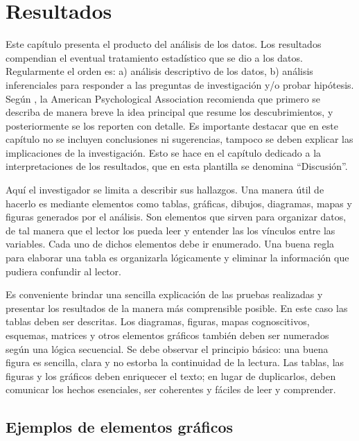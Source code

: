 \fancyhead{}
\fancyfoot{}
\cfoot{\thepage}


\chapter{Resultados}

Este capítulo presenta el producto del análisis de los datos. Los resultados compendian el eventual tratamiento estadístico que se dio a los datos. Regularmente el orden es: a) análisis descriptivo de los datos, b) análisis inferenciales para responder a las preguntas de investigación y/o probar hipótesis. Según \cite{sampieri}, la American Psychological Association recomienda que primero se describa de manera breve la idea principal que resume los descubrimientos, y posteriormente se los reporten con detalle. Es importante destacar que en este capítulo no se incluyen conclusiones ni sugerencias, tampoco se deben explicar las implicaciones de la investigación. Esto se hace en el capítulo dedicado a la interpretaciones de los resultados, que en esta plantilla se denomina ``Discusión''.

Aquí el investigador se limita a describir sus hallazgos. Una manera útil de hacerlo es mediante elementos como tablas, gráficas, dibujos, diagramas, mapas y figuras generados por el análisis. Son elementos que sirven para organizar datos, de tal manera que el lector los pueda leer y entender las los vínculos entre las variables. Cada uno de dichos elementos debe ir enumerado. Una buena regla para elaborar una tabla es organizarla lógicamente y eliminar la información que pudiera confundir al lector.

Es conveniente brindar una sencilla explicación de las pruebas realizadas y presentar los resultados de la manera más comprensible posible. En este caso las tablas deben ser descritas. Los diagramas, figuras, mapas cognoscitivos, esquemas, matrices y otros elementos gráficos también deben ser numerados según una  lógica secuencial. Se debe observar el principio básico: una buena figura es sencilla, clara y no estorba la continuidad de la lectura. Las tablas, las figuras y los gráficos deben enriquecer el texto; en lugar de duplicarlos, deben comunicar los hechos esenciales, ser coherentes y fáciles de leer y comprender. 

\section{Ejemplos de elementos gráficos}

